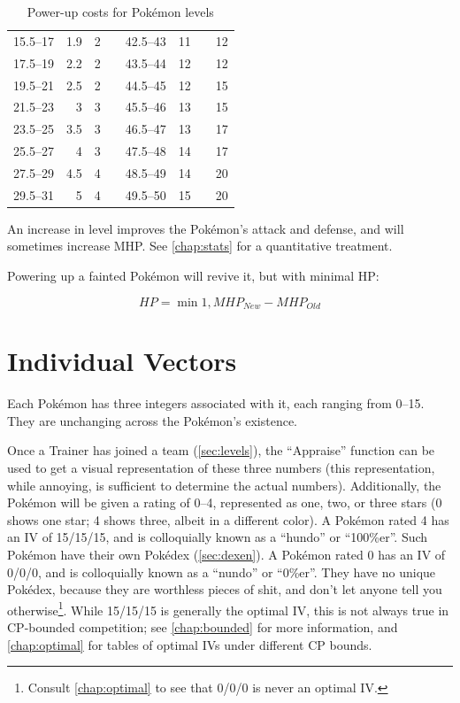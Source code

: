 \begin{table}
\begin{center}
\begin{tabular}[ht]{rrrr|rrrr}
    15.5--17 & 1.9 & 2 & & 42.5--43 &  11 &    & 12 \\
    17.5--19 & 2.2 & 2 & & 43.5--44 &  12 &    & 12 \\
    19.5--21 & 2.5 & 2 & & 44.5--45 &  12 &    & 15 \\
    21.5--23 &   3 & 3 & & 45.5--46 &  13 &    & 15 \\
    23.5--25 & 3.5 & 3 & & 46.5--47 &  13 &    & 17 \\
    25.5--27 &   4 & 3 & & 47.5--48 &  14 &    & 17 \\ 
    27.5--29 & 4.5 & 4 & & 48.5--49 &  14 &    & 20 \\
    29.5--31 &   5 & 4 & & 49.5--50 &  15 &    & 20 \\
    \end{tabular}
  \end{center}
  \caption{Power-up costs for Pokémon levels}
  \label{table:powerups}
\end{table}
An increase in level improves the Pokémon's attack and defense, and
  will sometimes increase MHP.
See \autoref{chap:stats} for a quantitative treatment.

Powering up a fainted Pokémon will revive it, but with minimal HP\@:

\[ HP = \min{1, MHP_{New} - MHP_{Old} } \]

\section{Individual Vectors}
\label{sec:ivs}
Each Pokémon has three integers associated with it, each ranging from 0--15.
They are unchanging across the Pokémon's existence.

Once a Trainer has joined a team (\autoref{sec:levels}), the ``Appraise'' function can be used to
  get a visual representation of these three numbers (this representation,
  while annoying, is sufficient to determine the actual numbers).
Additionally, the Pokémon will be given a rating of 0--4, represented as
  one, two, or three stars (0 shows one star; 4 shows three, albeit in a different color).
A Pokémon rated 4 has an IV of 15/15/15, and is colloquially known as a ``hundo'' or ``100\%er''.
Such Pokémon have their own Pokédex (\autoref{sec:dexen}).
A Pokémon rated 0 has an IV of 0/0/0, and is colloquially known as a ``nundo'' or ``0\%er''.
They have no unique Pokédex, because they are worthless pieces of shit,
  and don't let anyone tell you otherwise\footnote{Consult \autoref{chap:optimal}
  to see that 0/0/0 is never an optimal IV.}.
While 15/15/15 is generally the optimal IV, this is not always true in CP-bounded
  competition; see \autoref{chap:bounded} for more information,
  and \autoref{chap:optimal} for tables of optimal IVs under different CP bounds.

